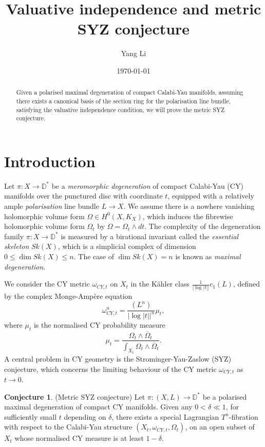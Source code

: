 \documentclass[a4paper]{article}
\title{Valuative independence and metric SYZ conjecture}
\author{Yang Li}
\date{\today}
\theoremstyle{definition}
\newtheorem{conj}[thm]{Conjecture}
\begin{document}
	\maketitle
	
	
	
	\begin{abstract}
		Given a polarised maximal degeneration of compact Calabi-Yau manifolds, assuming there exists  a canonical basis of the section ring for the polarisation line bundle, satisfying the valuative independence condition, we will prove the metric SYZ conjecture.
	\end{abstract}	
	
	
	
	
	
	\section{Introduction}
	
	
	
	
	
	
	
		Let $\pi: X\to \mathbb{D}^*$ be a \emph{meromorphic degeneration} of compact Calabi-Yau (CY) manifolds over the punctured disc with coordinate $t$, equipped with a relatively ample \emph{polarisation} line bundle $L\to X$.   We assume there is a nowhere vanishing holomorphic volume form $\Omega\in H^0(X, K_X)$, which induces the fibrewise holomorphic volume form $\Omega_t$ by $\Omega=\Omega_t\wedge dt$. The complexity of the degeneration family  $\pi: X\to \mathbb{D}^*$ is measured by a birational invariant called the \emph{essential skeleton} $Sk(X)$, which is a simplicial complex of dimension $0\leq \dim Sk(X)\leq n$. The case of $\dim Sk(X)=n$ is known as  \emph{maximal degeneration}.
	
	
	
	
	
	We consider the CY metric $\omega_{CY,t}$ on $X_t$ in the K\"ahler class $\frac{1}{|\log |t||} c_1(L)$, defined by the complex Monge-Amp\`ere equation
	\[
	\omega_{CY,t}^n= \frac{ (L^n) }{ |\log |t||^n  } \mu_t,
	\]
	where $\mu_t$ is the normalised CY probability measure
	\[
	\mu_t=  \frac{  \Omega_t\wedge \overline{\Omega}_t}{    \int_{X_t}  \Omega_t\wedge \overline{\Omega}_t    }.
	\]
	A central problem in CY geometry is the Strominger-Yau-Zaslow (SYZ) conjecture, which concerns the limiting behaviour of the CY metric  $\omega_{CY,t}$ as $t\to 0$. 
	
	\begin{conj}
		(Metric SYZ conjecture) Let $\pi: (X,L)\to \mathbb{D}^*$ be a polarised maximal degeneration of  compact CY manifolds. Given any $0<\delta\ll 1$, for sufficiently small $t$ depending on $\delta$, there exists a special Lagrangian $T^n$-fibration with respect to the Calabi-Yau structure $(X_t, \omega_{CY,t}, \Omega_t)$, on an open subset of $X_t$ whose normalised CY measure is at least $1-\delta$.
	\end{conj}	
	
\end{document}
